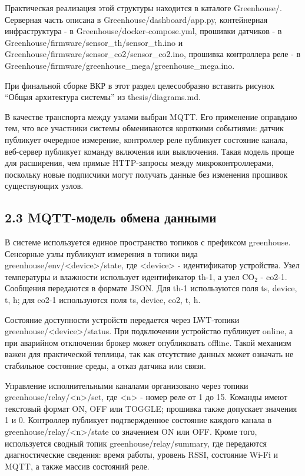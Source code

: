 \documentclass[a4paper,14pt]{extarticle}
\renewcommand{\texttt}[1]{\textnormal{#1}}
\begin{document}
Практическая реализация этой структуры находится в каталоге
\texttt{Greenhouse/}. Серверная часть описана в
\texttt{Greenhouse/dashboard/app.py}, контейнерная инфраструктура - в
\texttt{Greenhouse/docker-compose.yml}, прошивки датчиков - в
\texttt{Greenhouse/firmware/sensor\_th/sensor\_th.ino} и
\texttt{Greenhouse/firmware/sensor\_co2/sensor\_co2.ino}, прошивка
контроллера реле - в
\texttt{Greenhouse/firmware/greenhouse\_mega/greenhouse\_mega.ino}.

При финальной сборке ВКР в этот раздел целесообразно вставить рисунок
``Общая архитектура системы'' из \texttt{thesis/diagrams.md}.

В качестве транспорта между узлами выбран MQTT. Его применение оправдано
тем, что все участники системы обмениваются короткими событиями: датчик
публикует очередное измерение, контроллер реле публикует состояние
канала, веб-сервер публикует команду включения или выключения. Такая
модель проще для расширения, чем прямые HTTP-запросы между
микроконтроллерами, поскольку новые подписчики могут получать данные без
изменения прошивок существующих узлов.

\subsection{2.3 MQTT-модель обмена
данными}\label{mqtt-ux43cux43eux434ux435ux43bux44c-ux43eux431ux43cux435ux43dux430-ux434ux430ux43dux43dux44bux43cux438}

В системе используется единое пространство топиков с префиксом
\texttt{greenhouse}. Сенсорные узлы публикуют измерения в топики вида
\texttt{greenhouse/env/\textless{}device\textgreater{}/state}, где
\texttt{\textless{}device\textgreater{}} - идентификатор устройства.
Узел температуры и влажности использует идентификатор \texttt{th-1}, а
узел CO\(_2\) - \texttt{co2-1}. Сообщения передаются в формате JSON. Для
\texttt{th-1} используются поля \texttt{ts}, \texttt{device},
\texttt{t}, \texttt{h}; для \texttt{co2-1} используются поля
\texttt{ts}, \texttt{device}, \texttt{co2}, \texttt{t}, \texttt{h}.

Состояние доступности устройств передается через LWT-топики
\texttt{greenhouse/\textless{}device\textgreater{}/status}. При
подключении устройство публикует \texttt{online}, а при аварийном
отключении брокер может опубликовать \texttt{offline}. Такой механизм
важен для практической теплицы, так как отсутствие данных может означать
не стабильное состояние среды, а отказ датчика или связи.

Управление исполнительными каналами организовано через топики
\texttt{greenhouse/relay/\textless{}n\textgreater{}/set}, где
\texttt{\textless{}n\textgreater{}} - номер реле от 1 до 15. Команды
имеют текстовый формат \texttt{ON}, \texttt{OFF} или \texttt{TOGGLE};
прошивка также допускает значения \texttt{1} и \texttt{0}. Контроллер
публикует подтвержденное состояние каждого канала в
\texttt{greenhouse/relay/\textless{}n\textgreater{}/state} со значением
\texttt{ON} или \texttt{OFF}. Кроме того, используется сводный топик
\texttt{greenhouse/relay/summary}, где передаются диагностические
сведения: время работы, уровень RSSI, состояние Wi-Fi и MQTT, а также
массив состояний реле.
\end{document}
